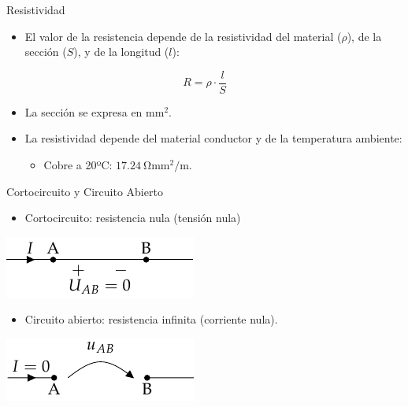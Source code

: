\documentclass[xcolor={usenames,svgnames,dvipsnames}]{beamer}
\begin{document}
\begin{frame}[label={sec:org6b2c1e8}]{Resistividad}
\begin{itemize}
\item El valor de la resistencia depende de la \alert{resistividad del material} (\(\rho\)), de la \alert{sección} (\(S\)), y de la
longitud (\(l\)):
\end{itemize}
\begin{equation*}
  R = \rho \cdot \frac{l}{S}
\end{equation*}

\begin{itemize}
\item La \alert{sección} se expresa en \(\si{\milli\meter\squared}\).

\item La \alert{resistividad} depende del material conductor y de la temperatura ambiente:

\begin{itemize}
\item Cobre a 20ºC: \(\SI{17.24}{\ohm\milli\meter\squared\per\meter}\).
\end{itemize}
\end{itemize}
\end{frame}

\begin{frame}[label={sec:orgbefac65}]{Cortocircuito y Circuito Abierto}
\begin{itemize}
\item Cortocircuito: resistencia nula (tensión nula)
\end{itemize}

\begin{center}
\includegraphics[height=0.2\textheight]{figs/Cortocircuito.pdf}
\end{center}

\begin{itemize}
\item Circuito abierto: resistencia infinita (corriente nula).
\end{itemize}

\begin{center}
\includegraphics[height=0.2\textheight]{figs/CircuitoAbierto.pdf}
\end{center}
\end{frame}
\end{document}
